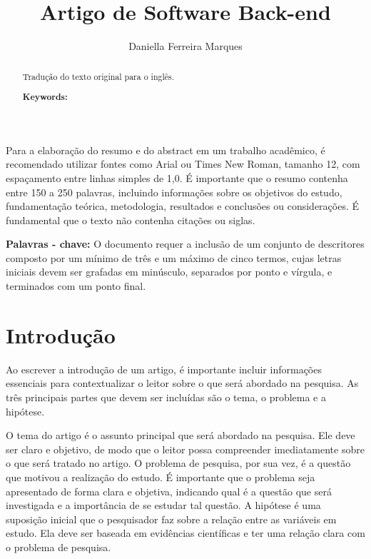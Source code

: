 \documentclass[12pt]{article}
\title{Artigo de Software Back-end}
\author{Daniella Ferreira Marques}
\begin{document}
 

\maketitle

\begin{abstract}
  Tradução do texto original para o inglês.   
  
  \textbf{Keywords:}
\end{abstract}
     
\begin{resumo}
   Para a elaboração do resumo e do abstract em um trabalho acadêmico, é recomendado utilizar fontes como Arial ou Times New Roman, tamanho 12, com espaçamento entre linhas simples de 1,0. É importante que o resumo contenha entre 150 a 250 palavras, incluindo informações sobre os objetivos do estudo, fundamentação teórica, metodologia, resultados e conclusões ou considerações. É fundamental que o texto não contenha citações ou siglas.  

   
   \textbf{Palavras - chave:} O documento requer a inclusão de um conjunto de descritores composto por um mínimo de três e um máximo de cinco termos, cujas letras iniciais devem ser grafadas em minúsculo, separados por ponto e vírgula, e terminados com um ponto final.
\end{resumo}


\section{Introdução}

Ao escrever a introdução de um artigo, é importante incluir informações essenciais para contextualizar o leitor sobre o que será abordado na pesquisa. As três principais partes que devem ser incluídas são o tema, o problema e a hipótese.

O tema do artigo é o assunto principal que será abordado na pesquisa. Ele deve ser claro e objetivo, de modo que o leitor possa compreender imediatamente sobre o que será tratado no artigo. O problema de pesquisa, por sua vez, é a questão que motivou a realização do estudo. É importante que o problema seja apresentado de forma clara e objetiva, indicando qual é a questão que será investigada e a importância de se estudar tal questão. A hipótese é uma suposição inicial que o pesquisador faz sobre a relação entre as variáveis em estudo. Ela deve ser baseada em evidências científicas e ter uma relação clara com o problema de pesquisa.
\end{document}
